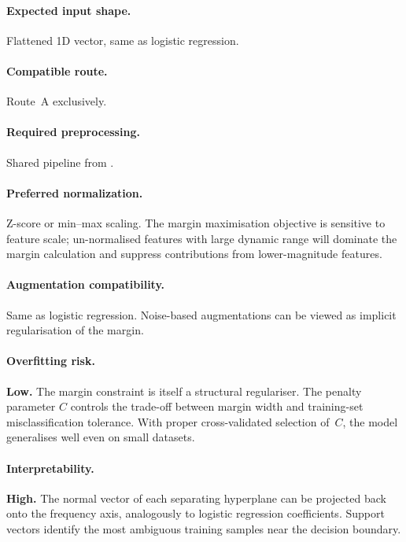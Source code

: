 \paragraph{Expected input shape.}
Flattened 1D vector, same as logistic regression.

\paragraph{Compatible route.}
Route~A exclusively.

\paragraph{Required preprocessing.}
Shared pipeline from .

\paragraph{Preferred normalization.}
Z-score or min--max scaling.  The margin maximisation objective is
sensitive to feature scale; un-normalised features with large dynamic
range will dominate the margin calculation and suppress contributions
from lower-magnitude features.

\paragraph{Augmentation compatibility.}
Same as logistic regression.  Noise-based augmentations can be viewed
as implicit regularisation of the margin.

\paragraph{Overfitting risk.}
\textbf{Low.}  The margin constraint is itself a structural
regulariser.  The penalty parameter $C$ controls the trade-off between
margin width and training-set misclassification tolerance.  With proper
cross-validated selection of~$C$, the model generalises well even on
small datasets.

\paragraph{Interpretability.}
\textbf{High.}  The normal vector of each separating hyperplane can be
projected back onto the frequency axis, analogously to logistic
regression coefficients.  Support vectors identify the most ambiguous
training samples near the decision boundary.

